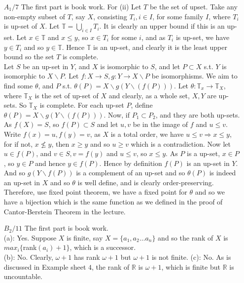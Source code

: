 \begin{enumerate}
\item[$A_1/7$] The first part is book work. For (ii) Let $T$ be the set of upset. Take any non-empty subset of $T$, say $X$, consisting $T_i, i \in I$, for some family $I$, where $T_i$ is up-set of $X$. Let $\mathbb{T}=\bigcup_{i \in I}T_i$. It is clearly an upper bound if this is an up-set.
    Let $x \in \mathbb{T}$ and $x \le y$, so $x \in T_i$ for some $i$, and as $T_i$ is up-set, we have $y \in T_i$ and so $y \in \mathbb{T}$. Hence $\mathbb{T}$ is an up-set, and clearly it is the least upper bound so the set $T$ is complete.\\
    Let $S$ be an up-set in $Y$, and $X$ is isomorphic to $S$, and let $P \subset X$ s.t. $Y$ is isomorphic to $X \backslash P$. Let $f: X \rightarrow S, g: Y \rightarrow X \backslash P$ be isomorphisms. We aim to find some $\theta$, and $P$ s.t. $\theta(P)=X \backslash g(Y \backslash(f(P)))$. Let $\theta: \mathbb{T}_x \rightarrow \mathbb{T}_X$, where $\mathbb{T}_X$ is the set of up-set of $X$ and clearly, as a whole set, $X,Y$ are up-sets. So $\mathbb{T}_X$ is complete. For each up-set $P$, define $\theta(P)=X \backslash g(Y \backslash (f(P)))$. Now, if $P_1 \subset P_2$, and they are both up-sets. As $f(X)=S$, so $f(P) \subset S$ and let $u,v$ be in the image of $f$ and $u \le v$. Write $f(x)=u, f(y)=v$, as $X$ is a total order, we have $u \le v \Rightarrow x \le y$, for if not, $x \not \le y$, then $x \ge y$ and so $u \ge v$ which is a contradiction. Now let $u \in f(P)$, and $v \in S, v=f(y)$ and $u \le v$, so $x \le y$. As $P$ is a up-set, $x \in P$, so $y \in P$ and hence $y \in f(P)$. Hence by definition $f(P)$ is an up-set in $Y$. And so $g(Y \backslash f(P))$ is a complement of an up-set and so $\theta(P)$ is indeed an up-set in $X$ and so $\theta$ is well define, and is clearly order-preserving. Therefore, use fixed point theorem, we have a fixed point for $\theta$ and so we have a bijection which is the same function as we defined in the proof of Cantor-Berstein Theorem in the lecture.\\
\item[$B_2/11$] The first part is book work.\\
     (a): Yes. Suppose $X$ is finite, say $X=\{a_1, a_2 \ldots a_n\}$ and so the rank of $X$ is $max_i \{$rank$(a_i)+1\}$, which is a successor.\\
     (b): No. Clearly, $\omega+1$ has rank $\omega+1$ but $\omega+1$ is not finite.
     (c): No. As is discussed in Example sheet $4$, the rank of $\mathbb{R}$ is $\omega+1$, which is finite but $\mathbb{R}$ is uncountable.\\

\end{enumerate}
